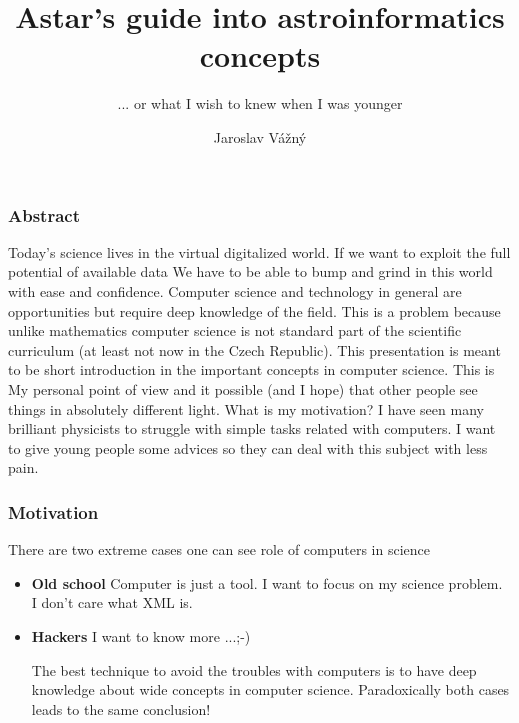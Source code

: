 \documentclass[fleqn]{beamer}
\title[Computers in Science] %
{Astar's  guide into astroinformatics concepts}
\subtitle{... or what I wish to knew when I was younger} %
\author[Jaroslav Vážný] %
{Jaroslav Vážný }
\institute[Universities of Somewhere and Elsewhere] %
{

    Masarykova univerzita

}
\begin{document}
 




\begin{frame}
  \titlepage
\end{frame}




\begin{frame}\frametitle{Abstract}
\small{Today's science lives in the virtual digitalized world. If we
  want to exploit the full potential of available data We have to be
  able to bump and grind in this world with ease and confidence.
  Computer science and technology in general are opportunities but
  require deep knowledge of the field.  This is a problem because
  unlike mathematics computer science is not standard part of the
  scientific curriculum (at least not now in the Czech Republic). This
  presentation is meant to be short introduction in the important
  concepts in computer science.  This is My personal point of view and
  it possible (and I hope) that other people see things in absolutely
  different light. What is my motivation? I have seen many brilliant
  physicists to struggle with simple tasks related with computers. I
  want to give young people some advices so they can deal with this
  subject with less pain.}



\end{frame}


\begin{frame}\frametitle{Motivation}
  There are two extreme cases one can see role of computers in science
  \begin{itemize}
  \item \textbf{Old school} Computer is just a tool. I want to focus
    on my science problem. I don't care what XML is.
  \item \textbf{Hackers} I want to know more ...;-) 

\bigskip

The best technique to avoid the troubles with computers is to have deep
knowledge about wide concepts in computer science. Paradoxically both
cases leads to the same conclusion!
  \end{itemize}
\end{frame}
\end{document}
